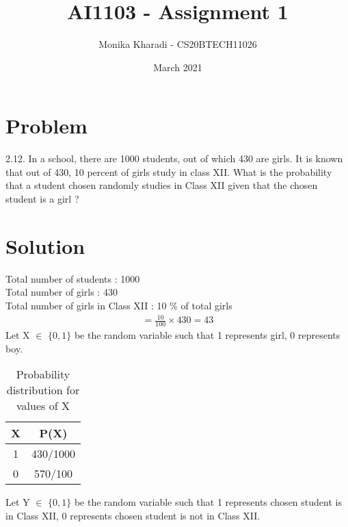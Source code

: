 \documentclass[journal,12pt,two column]{IEEEtran}
\title{AI1103 - Assignment 1}
\author{Monika Kharadi - CS20BTECH11026}
\date{March 2021}
\begin{document}
\maketitle
\section*{\large\textbf{Problem}}

2.12. In a school, there are 1000 students, out of which 430 are girls. It is known that out of 430, 10 percent of girls study in class XII. What is the probability that a student chosen randomly studies in Class XII given that the chosen student is a girl ?
{\section*{\large\textbf{Solution}}}
Total number of students : 1000 \\
Total number of girls : 430  \\
Total number of girls in Class XII : 10 \% of total girls 
\begin{align}
=\frac{10}{100}\times 430 =43
\end{align}
Let X $\in$ $\{0,1\}$ be the random variable such that 1 represents girl, 0 represents boy.
\begin{table}[ht]
\caption{Probability distribution for values of X}
\begin{center}
\begin{tabular}{|c|c|}
    \hline
    X & P(X) \\
    \hline
    1 & 430/1000\\
    \hline
    0 & 570/100\\
    \hline
    \end{tabular} 
\end{center}   
\end{table}

Let Y $\in$ $\{0,1\}$ be the random variable such that 1 represents chosen student is in Class XII, 0 represents chosen student is not in Class XII.
\end{document}
